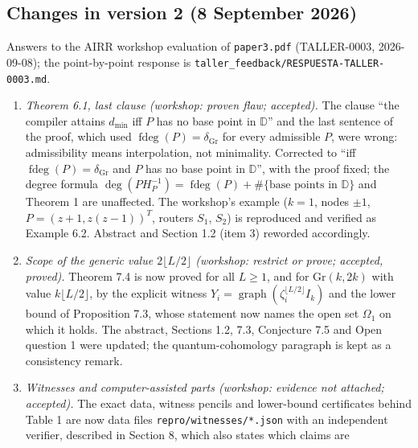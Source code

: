\documentclass[
  11pt,
  a4paper,
]{article}
\providecommand{\tightlist}{%
  \setlength{\itemsep}{0pt}\setlength{\parskip}{0pt}}
\begin{document}
\subsection{Changes in version 2 (8 September
2026)}\label{changes-in-version-2-8-september-2026}

Answers to the AIRR workshop evaluation of {\small\texttt{paper3.\allowbreak{}pdf}}
(TALLER-0003, 2026-09-08); the point-by-point response is
{\small\texttt{taller\_\allowbreak{}feedback/\allowbreak{}RESPUESTA-TALLER-0003.\allowbreak{}md}}.

\begin{enumerate}
\def\labelenumi{\arabic{enumi}.}
\tightlist
\item
  \emph{Theorem 6.1, last clause (workshop: proven flaw; accepted).} The
  clause ``the compiler attains \(d_{\min}\) iff \(P\) has no base point
  in \(\mathbb D\)'' and the last sentence of the proof, which used
  \(\operatorname{fdeg}(P)=\delta_{\mathrm{Gr}}\) for every admissible
  \(P\), were wrong: admissibility means interpolation, not minimality.
  Corrected to ``iff \(\operatorname{fdeg}(P)=\delta_{\mathrm{Gr}}\) and
  \(P\) has no base point in \(\mathbb D\)'', with the proof fixed; the
  degree formula
  \(\deg(PH_P^{-1})=\operatorname{fdeg}(P)+\#\{\text{base points in }\mathbb D\}\)
  and Theorem 1 are unaffected. The workshop's example (\(k=1\), nodes
  \(\pm1\), \(P=(z+1,\allowbreak{}z(z-1))^T\), routers \(S_1\), \(S_2\)) is
  reproduced and verified as Example 6.2. Abstract and Section 1.2 (item
  3) reworded accordingly.
\item
  \emph{Scope of the generic value \(2\lfloor L/2\rfloor\) (workshop:
  restrict or prove; accepted, proved).} Theorem 7.4 is now proved for
  all \(L\ge1\), and for \(\mathrm{Gr}(k,\allowbreak{}2k)\) with value
  \(k\lfloor L/2\rfloor\), by the explicit witness
  \(Y_i=\operatorname{graph}(\zeta_i^{\lfloor L/2\rfloor}I_k)\) and the
  lower bound of Proposition 7.3, whose statement now names the open set
  \(\Omega_1\) on which it holds. The abstract, Sections 1.2, 7.3,
  Conjecture 7.5 and Open question 1 were updated; the
  quantum-cohomology paragraph is kept as a consistency remark.
\item
  \emph{Witnesses and computer-assisted parts (workshop: evidence not
  attached; accepted).} The exact data, witness pencils and lower-bound
  certificates behind Table 1 are now data files
  {\small\texttt{repro/\allowbreak{}witnesses/\allowbreak{}*.\allowbreak{}json}} with an independent verifier,
  described in Section 8, which also states which claims are

\end{enumerate}
\end{document}

